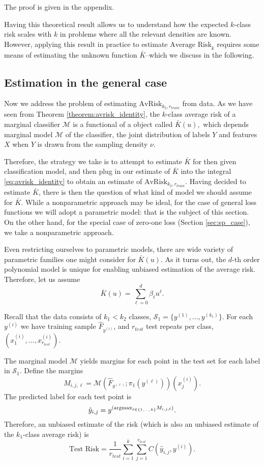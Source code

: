 \documentclass[12pt]{article}
\begin{document}
The proof is given in the appendix.

Having this theoretical result allows us to understand how the
expected $k$-class risk scales with $k$ in problems where all the
relevant densities are known.  However, applying this result in
practice to estimate $\text{Average Risk}_k$ requires some means of
estimating the unknown function $\bar{K}$--which we discuss in the
following.

\subsection{Estimation in the general case}\label{sec:estimation}

Now we address the problem of estimating $\text{AvRisk}_{k_2,
r_{train}}$ from data.  As we have seen from
Theorem \ref{theorem:avrisk_identity}, the $k$-class average risk of
a marginal classifier $\mathcal{M}$ is a functional of a object called
$\bar{K}(u),$ which depends marginal model $\mathcal{M}$ of the
classifier, the joint distribution of labels $Y$ and features $X$ when
$Y$ is drawn from the sampling density $\nu$.

Therefore, the strategy we take is to attempt to estimate $\bar{K}$
for then given classification model, and then plug in our estimate of
$\bar{K}$ into the integral \eqref{eq:avrisk_identity} to obtain an
estimate of $\text{AvRisk}_{k_2, r_{train}}$.  Having decided to
estimate $\bar{K}$, there is then the question of what kind of model
we should assume for $\bar{K}$.  While a nonparametric approach may be
ideal, for the case of general loss functions we will adopt a
parametric model: that is the subject of this section.  On the other
hand, for the special case of zero-one loss
(Section \ref{sec:sp_case}), we take a nonparametric approach.

Even restricting ourselves to parametric models, there are wide
variety of parametric families one might consider for $\bar{K}(u)$.
As it turns out, the $d$-th order polynomial model is unique for
enabling unbiased estimation of the average risk.  Therefore, let us
assume
\[
\bar{K}(u) = \sum_{\ell = 0}^d \beta_\ell u^\ell.
\]

Recall that the data consists of $k_1 < k_2$ classes, $\mathcal{S}_1 =
\{y^{(1)},\hdots, y^{(k_1)}\}$. For each $y^{(i)}$ we have training sample $\hat{F}_{y^{(i)}}$, and
$r_{test}$ test repeats per class, $(x_1^{(i)},\hdots,
x_{r_{test}}^{(i)})$.

The marginal model $\mathcal{M}$ yields margins for each point in the
test set for each label in $\mathcal{S}_1$.  Define the margins
\[
M_{i, j, \ell} = \mathcal{M}(\hat{F}_{y^{(\ell)}}; \pi_1(y^{(\ell)}))(x_j^{(i)}).
\]
The predicted label for each test point is
\[
\hat{y}_{i,j} = y^{(\text{argmax}_{\ell \in \{1,\hdots, k\}} M_{i, j, \ell})}.
\]
Therefore, an unbiased estimate of the risk (which is also an unbiased
estimate of the $k_1$-class average risk) is
\[
\text{Test Risk} = \frac{1}{r_{test}}\sum_{i=1}^k \sum_{j=1}^{r_{test}} C(\hat{y}_{i, j}, y^{(i)}).
\]
\end{document}
